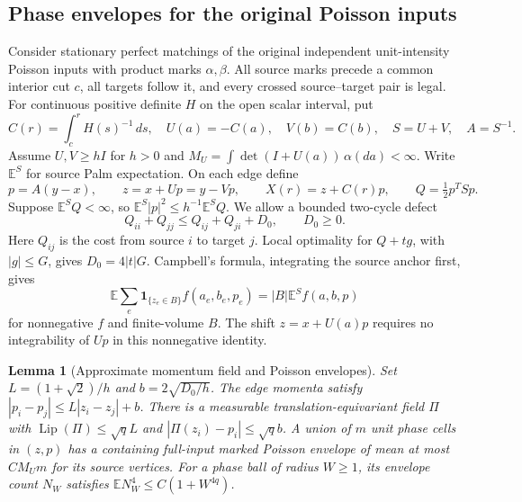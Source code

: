 \documentclass[11pt,reqno]{amsart}
\newtheorem{lemma}[theorem]{Lemma}
\theoremstyle{definition}
\theoremstyle{remark}
\numberwithin{equation}{section}
\newcommand{\E}{\mathbb E}
\newcommand{\Lip}{\operatorname{Lip}}
\begin{document}
\subsection{Phase envelopes for the original Poisson inputs}

Consider stationary perfect matchings of the original independent
unit-intensity Poisson inputs with product marks $\alpha,\beta$.
All source marks precede a common interior cut $c$, all targets follow
it, and every crossed source--target pair is legal. For continuous
positive definite $H$ on the open scalar interval, put
\[
 C(r)=\int_c^r H(s)^{-1}\,ds,\quad U(a)=-C(a),\quad V(b)=C(b),
 \quad S=U+V,\quad A=S^{-1}.
\]
Assume $U,V\ge hI$ for $h>0$ and
$M_U=\int\det(I+U(a))\,\alpha(da)<\infty$.
Write $\E^S$ for source Palm expectation. On each edge define
\[
 p=A(y-x),\qquad z=x+Up=y-Vp,\qquad X(r)=z+C(r)p,
 \qquad Q=\tfrac12p^TSp.
\]
Suppose $\E^S Q<\infty$, so $\E^S|p|^2\le h^{-1}\E^S Q$.
We allow a bounded two-cycle defect
\begin{equation}\label{eq:degenerate-central-cycle-defect}
 Q_{ii}+Q_{jj}\le Q_{ij}+Q_{ji}+D_0,\qquad D_0\ge0.
\end{equation}
Here $Q_{ij}$ is the cost from source $i$ to target $j$.
Local optimality for $Q+tg$, with $|g|\le G$, gives $D_0=4|t|G$.
Campbell's formula, integrating the source anchor first, gives
\begin{equation}\label{eq:degenerate-cut-campbell}
 \E\sum_e\mathbf1_{\{z_e\in B\}}f(a_e,b_e,p_e)
 =|B|\E^S f(a,b,p)
\end{equation}
for nonnegative $f$ and finite-volume $B$. The shift $z=x+U(a)p$
requires no integrability of $Up$ in this nonnegative identity.

\begin{lemma}[Approximate momentum field and Poisson envelopes]
\label{degenerate-central-phase-envelope}
Set $L=(1+\sqrt2)/h$ and $b=2\sqrt{D_0/h}$.
The edge momenta satisfy $|p_i-p_j|\le L|z_i-z_j|+b$.
There is a measurable translation-equivariant field $\Pi$ with
$\Lip(\Pi)\le\sqrt qL$ and $|\Pi(z_i)-p_i|\le\sqrt q b$.
A union of $m$ unit phase cells in $(z,p)$ has a containing full-input
marked Poisson envelope of mean at most $C M_Um$ for its source vertices.
For a phase ball of radius $W\ge1$, its envelope count $N_W$ satisfies
$\E N_W^4\le C(1+W^{4q})$.
\end{lemma}
\end{document}

